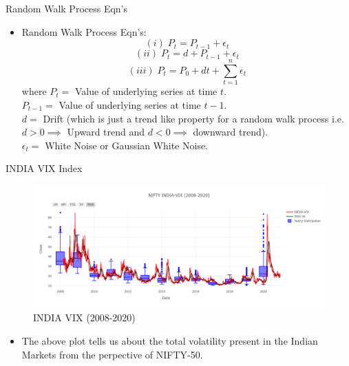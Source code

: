 \documentclass{beamer}
\begin{document}
\begin{frame}{Random Walk Process Eqn's}
	\begin{itemize}
		\item Random Walk Process Eqn's:  $$(i)\; P_{t} = P_{t - 1} + \epsilon_{t}$$
		      $$ (ii)\; P_{t} = d + P_{t - 1} + \epsilon_{t}$$
		      $$ (iii)\; P_{t} = P_{0} + dt + \sum_{t = 1}^{n} \epsilon_{t} $$
		      where   $P_{t} = $ Value of underlying series at time $t$. \\
		      $P_{t - 1} = $  Value of underlying series at time $t - 1$. \\
		      $d = $ Drift (which is just a trend like property for a random walk process i.e.\\ $d > 0 \implies$ Upward trend and $d < 0 \implies$ downward trend).\\
		      $\epsilon_{t} = $ White Noise or Gaussian White Noise.
	\end{itemize}
\end{frame}

\begin{frame}{INDIA VIX Index}
	\begin{figure}
		\centering
		\includegraphics[width = 0.95 \textwidth]{images/INDIA-VIX-2008-2020}
		\caption{INDIA VIX (2008-2020)}
		\label{fig:my_label}
	\end{figure}
	\begin{itemize}
		\item The above plot tells us about the total volatility present in the Indian Markets from the perpective of NIFTY-50.
	\end{itemize}
\end{frame}
\end{document}
